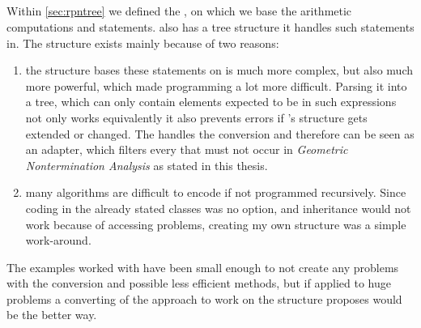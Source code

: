 \subsection{\rpntree}
Within \autoref{sec:rpntree} we defined the \rpntree, on which we base the arithmetic computations and statements. \aprove also has a tree structure it handles such statements in. The \rpntree structure exists mainly because of two reasons:
\begin{enumerate}
	\item the structure \aprove bases these statements on is much more complex, but also much more powerful, which made programming a lot more difficult. Parsing it into a tree, which can only contain elements expected to be in such expressions not only works equivalently it also prevents errors if \aprove's structure gets extended or changed. The  handles the conversion and therefore can be seen as an adapter, which filters every \its that must not occur in \textit{Geometric Nontermination Analysis} as stated in this thesis.
	\item many algorithms are difficult to encode if not programmed recursively. Since coding in the already stated classes was no option, and inheritance would not work because of accessing problems, creating my own structure was a simple work-around.
\end{enumerate}
The examples worked with have been small enough to not create any problems with the conversion and possible less efficient methods, but if applied to huge problems a converting of the approach to work on the structure \aprove proposes would be the better way.